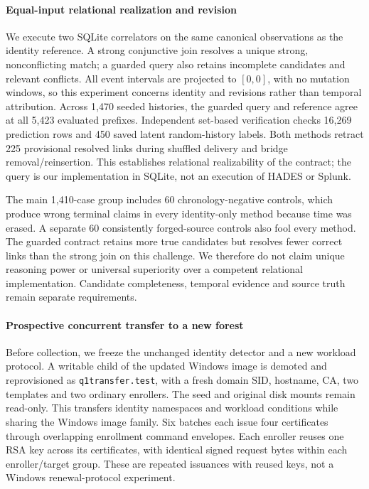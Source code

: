 \paragraph{Equal-input relational realization and revision}
We execute two SQLite correlators on the same canonical observations as the identity reference. A strong conjunctive join resolves a unique strong, nonconflicting match; a guarded query also retains incomplete candidates and relevant conflicts. All event intervals are projected to $[0,0]$, with no mutation windows, so this experiment concerns identity and revisions rather than temporal attribution. Across 1,470 seeded histories, the guarded query and reference agree at all 5,423 evaluated prefixes. Independent set-based verification checks 16,269 prediction rows and 450 saved latent random-history labels. Both methods retract 225 provisional resolved links during shuffled delivery and bridge removal/reinsertion. This establishes relational realizability of the contract; the query is our implementation in SQLite, not an execution of HADES or Splunk.



The main 1,410-case group includes 60 chronology-negative controls, which produce wrong terminal claims in every identity-only method because time was erased. A separate 60 consistently forged-source controls also fool every method. The guarded contract retains more true candidates but resolves fewer correct links than the strong join on this challenge. We therefore do not claim unique reasoning power or universal superiority over a competent relational implementation. Candidate completeness, temporal evidence and source truth remain separate requirements.

\paragraph{Prospective concurrent transfer to a new forest}
Before collection, we freeze the unchanged identity detector and a new workload protocol. A writable child of the updated Windows image is demoted and reprovisioned as \texttt{q1transfer.test}, with a fresh domain SID, hostname, CA, two templates and two ordinary enrollers. The seed and original disk mounts remain read-only. This transfers identity namespaces and workload conditions while sharing the Windows image family. Six batches each issue four certificates through overlapping enrollment command envelopes. Each enroller reuses one RSA key across its certificates, with identical signed request bytes within each enroller/target group. These are repeated issuances with reused keys, not a Windows renewal-protocol experiment.

